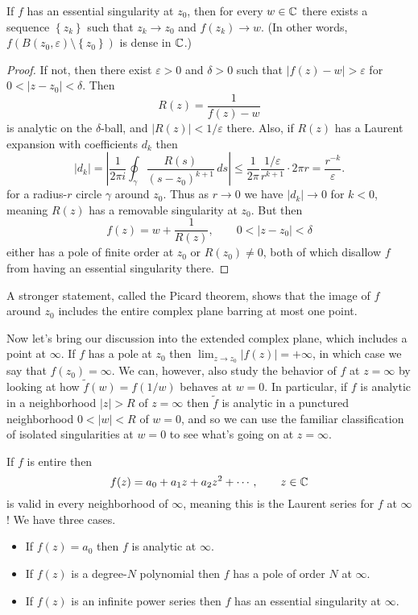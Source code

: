 \documentclass[../m136main.tex]{subfiles}
\begin{document}
\begin{theorem}
    If $f$ has an essential singularity at $z_0$, then for every $w \in \mathbb{C}$ there exists a sequence $\left\{ z_k \right\}$ such that $z_k \to z_0$ and $f(z_k) \to w$.
    (In other words, $f(B(z_0, \varepsilon) \setminus \left\{ z_0 \right\})$ is dense in $\mathbb{C}$.)
\end{theorem}

\begin{proof}
    If not, then there exist $\varepsilon > 0$ and $\delta > 0$ such that $|f(z) - w| > \varepsilon$ for $0 < |z - z_0| < \delta$.
    Then
    \[ R(z) = \frac{1}{f(z) - w} \]
    is analytic on the $\delta$-ball, and $|R(z)| < 1 / \varepsilon$ there.
    Also, if $R(z)$ has a Laurent expansion with coefficients $d_k$ then
    \[ |d_k| = \left| \frac{1}{2\pi i} \oint_\gamma \frac{R(s)}{(s - z_0)^{k+1}} \,ds \right| \leq \frac{1}{2\pi} \frac{1 / \varepsilon}{r^{k+1}} \cdot 2\pi r = \frac{r^{-k}}{\varepsilon}. \]
    for a radius-$r$ circle $\gamma$ around $z_0$.
    Thus as $r \to 0$ we have $|d_k| \to 0$ for $k < 0$, meaning $R(z)$ has a removable singularity at $z_0$.
    But then
    \[ f(z) = w + \frac{1}{R(z)}, \qquad 0 < |z - z_0| < \delta \]
    either has a pole of finite order at $z_0$ or $R(z_0) \neq 0$, both of which disallow $f$ from having an essential singularity there.
\end{proof}

A stronger statement, called the Picard theorem, shows that the image of $f$ around $z_0$ includes the entire complex plane barring at most one point.

Now let's bring our discussion into the extended complex plane, which includes a point at $\infty$.
If $f$ has a pole at $z_0$ then $\lim_{z \to z_0} |f(z)| = +\infty$, in which case we say that $f(z_0) = \infty$.
We can, however, also study the behavior of $f$ at $z = \infty$ by looking at how $\tilde f(w) = f(1 / w)$ behaves at $w=0$.
In particular, if $f$ is analytic in a neighborhood $|z| > R$ of $z=\infty$ then $\tilde f$ is analytic in a punctured neighborhood $0 < |w| < R$ of $w=0$, and so we can use the familiar classification of isolated singularities at $w=0$ to see what's going on at $z=\infty$.

If $f$ is entire then
\[ f(z) = a_0 + a_1 z + a_2 z^2 + \cdots, \qquad z \in \mathbb{C} \]
is valid in every neighborhood of $\infty$, meaning this is the Laurent series for $f$ at $\infty$!
We have three cases.
\begin{itemize}[topsep=0pt]
    \item If $f(z) = a_0$ then $f$ is analytic at $\infty$.
    \item If $f(z)$ is a degree-$N$ polynomial then $f$ has a pole of order $N$ at $\infty$.
    \item If $f(z)$ is an infinite power series then $f$ has an essential singularity at $\infty$.
\end{itemize}
\end{document}
